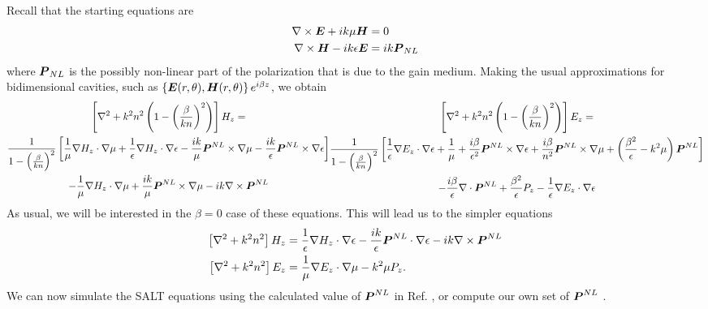 Recall that the starting equations are 
  \begin{align*}
   \nabla\times\boldsymbol{E}+ik\mu\boldsymbol{H}	&=0	\\
   \nabla\times\boldsymbol{H}-ik\epsilon\boldsymbol{E}	&=ik\boldsymbol{P}_{NL}
  \end{align*}
where $\boldsymbol{P}_{NL}$ is the possibly non-linear part 
of the polarization that is due to the gain medium.
Making the usual approximations for bidimensional cavities, 
such as $\left\{\boldsymbol{E}(r,\theta),\boldsymbol{H}(r,\theta)\right\}e^{i\beta z}$, 
we obtain
	\begin{subequations}
	\begin{multline}
   		\left[\nabla^2+k^2n^2\left(1-\left(\frac{\beta}{kn}\right)^2\right)\right]H_z=\\
	  	\frac{1}{1-\left(\frac{\beta}{kn}\right)^2}\left[\frac{1}{\mu}\nabla H_z\cdot\nabla\mu+\frac{1}{\epsilon}\nabla H_z\cdot\nabla\epsilon-\frac{ik}{\mu}\bo{P}^{NL}\times\nabla\mu-\frac{ik}{\epsilon}\bo{P}^{NL}\times\nabla\epsilon\right]\\
	  -\frac{1}{\mu}\nabla H_z\cdot\nabla\mu+\frac{ik}{\mu}\bo{P}^{NL}\times\nabla\mu-ik\nabla\times\bo{P}^{NL}
	\end{multline}
	\begin{multline}
  		\left[\nabla^2+k^2n^2\left(1-\left(\frac{\beta}{kn}\right)^2\right)\right]E_z=\\
  			\frac{1}{1-\left(\frac{\beta}{kn}\right)^2}\left[\frac{1}{\epsilon}\nabla E_z\cdot\nabla\epsilon+\frac{1}{\mu}+\frac{i\beta}{\epsilon^2}\bo{P}^{NL}\times\nabla\epsilon
			+\frac{i\beta}{n^2}\bo{P}^{NL}\times\nabla\mu+\left(\frac{\beta^2}{\epsilon}-k^2\mu\right)\bo{P}^{NL}\right]\\
	  		-\frac{i\beta}{\epsilon}\nabla\cdot\bo{P}^{NL}+\frac{\beta^2}{\epsilon}P_z-\frac{1}{\epsilon}\nabla E_z\cdot\nabla\epsilon
  \end{multline}
  \end{subequations}
As usual, we will be interested in the $\beta=0$ case of these equations.
This will lead us to the simpler equations
	\begin{subequations}
  \begin{align}
    	\left[\nabla^2+k^2n^2\right]H_z	&= \frac{1}{\epsilon}\nabla H_z\cdot\nabla\epsilon-\frac{ik}{\epsilon}\boldsymbol{P}^{NL}\cdot\nabla\epsilon-ik\nabla\times\boldsymbol{P}^{NL}\\
    	\left[\nabla^2+k^2n^2\right]E_z	&= \frac{1}{\mu}\nabla E_z\cdot\nabla\mu-k^2\mu P_z.
	\end{align}
	\end{subequations}
We can now simulate the SALT equations using the calculated value of $\boldsymbol{P}^{NL}$
in Ref. \cite{GE2010a,GE2010b}, or compute our own set of $\boldsymbol{P}^{NL}$ \cite{BOY2003}. 


